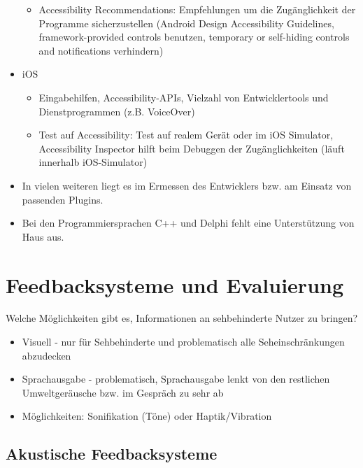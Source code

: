 \documentclass[paper=a4, fontsize=11pt]{scrartcl} %
\numberwithin{equation}{section} %
\numberwithin{figure}{section} %
\numberwithin{table}{section} %
\begin{document}
\begin{itemize}
\begin{itemize}
\item Accessibility Recommendations: Empfehlungen um die Zugänglichkeit der Programme sicherzustellen (Android Design Accessibility Guidelines, framework-provided controls benutzen, temporary or self-hiding controls and notifications verhindern)
\end{itemize}
\item iOS
\begin{itemize}
\item Eingabehilfen, Accessibility-APIs, Vielzahl von Entwicklertools und Dienstprogrammen (z.B. VoiceOver)
\item Test auf Accessibility: Test auf realem Gerät oder im iOS Simulator, Accessibility Inspector hilft beim Debuggen der Zugänglichkeiten (läuft innerhalb iOS-Simulator)
\end{itemize}
\item In vielen weiteren liegt es im Ermessen des Entwicklers bzw. am Einsatz von passenden Plugins.
\item Bei den Programmiersprachen C++ und Delphi fehlt eine Unterstützung von Haus aus.
\end{itemize}

\section{Feedbacksysteme und Evaluierung}

Welche Möglichkeiten gibt es, Informationen an sehbehinderte Nutzer zu bringen?
\begin{itemize}
\item Visuell - nur für Sehbehinderte und problematisch alle Seheinschränkungen abzudecken
\item Sprachausgabe - problematisch, Sprachausgabe lenkt von den restlichen Umweltgeräusche bzw. im Gespräch zu sehr ab
\item Möglichkeiten: Sonifikation (Töne) oder Haptik/Vibration
\end{itemize}

\subsection{Akustische Feedbacksysteme}
\end{document}
